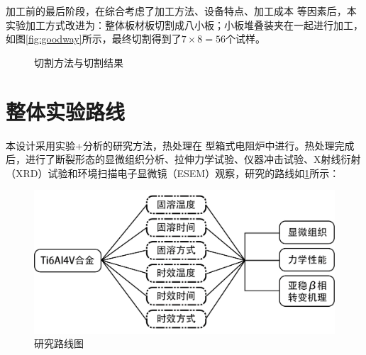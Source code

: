 加工前的最后阶段，在综合考虑了加工方法、设备特点、加工成本%
等因素后，本实验加工方式改进为：整体板材板切割成八小板；小板堆叠装夹在一起进行加工，如图\ref{fig:goodway}所示，最终切割得到了$ 7\times 8=56 $个试样。
\begin{figure}[h!]
	\centering
	\hspace{0.2in} %
	\caption{切割方法与切割结果}
\end{figure}

\section{整体实验路线}
本设计采用实验+分析的研究方法，热处理在%
型箱式电阻炉中进行。热处理完成后，进行了断裂形态的显微组织分析、拉伸力学试验、仪器冲击试验、X射线衍射（XRD）试验和环境扫描电子显微镜（ESEM）观察，研究的路线如\ref{fig:roadmap}所示：

\begin{figure}[h!]
	\centering
	\includegraphics[width=0.8\linewidth]{pic/路线图}
	\caption{研究路线图}
	\label{fig:roadmap}
\end{figure}
